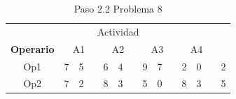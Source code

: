 \documentclass[12pt]{article}  %
\begin{document}
\begin{table}[H]
\centering
\caption{Paso 2.2 Problema 8}
\label{tab:Paso2.2Prob8}
\begin{tabular}{ccclcclcclcclc}
\multicolumn{14}{c}{Actividad}                                                                                                                                                                                                                                                                                                                                                                                                                                                                                                                                                                                                                                             \\ \cline{2-13}
\multicolumn{1}{c|}{\textbf{Operario}} & \multicolumn{3}{c|}{A1}                                                                                                                         & \multicolumn{3}{c|}{A2}                                                                                                                         & \multicolumn{3}{c|}{A3}                                                                                                                         & \multicolumn{3}{c|}{A4}                                                                                                                         & \multicolumn{1}{l}{}      \\ \cline{2-13}
\multicolumn{1}{c|}{Op1}               & \multicolumn{1}{c|}{\cellcolor[HTML]{67FD9A}7} & \multicolumn{1}{c|}{\cellcolor[HTML]{FFCC67}5} & \multicolumn{1}{l|}{\cellcolor[HTML]{FCFF2F}} & \multicolumn{1}{c|}{\cellcolor[HTML]{67FD9A}6} & \multicolumn{1}{c|}{\cellcolor[HTML]{FFCC67}4} & \multicolumn{1}{l|}{\cellcolor[HTML]{F8FF00}} & \multicolumn{1}{c|}{\cellcolor[HTML]{67FD9A}9} & \multicolumn{1}{c|}{\cellcolor[HTML]{FFCC67}7} & \multicolumn{1}{l|}{\cellcolor[HTML]{F8FF00}} & \multicolumn{1}{c|}{\cellcolor[HTML]{67FD9A}2} & \multicolumn{1}{c|}{\cellcolor[HTML]{FFC702}0} & \multicolumn{1}{l|}{\cellcolor[HTML]{F8FF00}} & \cellcolor[HTML]{FFCCC9}2 \\ \cline{2-13}
\multicolumn{1}{c|}{Op2}               & \multicolumn{1}{c|}{\cellcolor[HTML]{67FD9A}7} & \multicolumn{1}{c|}{\cellcolor[HTML]{FFCC67}2} & \multicolumn{1}{l|}{\cellcolor[HTML]{FCFF2F}} & \multicolumn{1}{c|}{\cellcolor[HTML]{67FD9A}8} & \multicolumn{1}{c|}{\cellcolor[HTML]{FFCC67}3} & \multicolumn{1}{l|}{\cellcolor[HTML]{F8FF00}} & \multicolumn{1}{c|}{\cellcolor[HTML]{67FD9A}5} & \multicolumn{1}{c|}{\cellcolor[HTML]{FFCC67}0} & \multicolumn{1}{l|}{\cellcolor[HTML]{F8FF00}} & \multicolumn{1}{c|}{\cellcolor[HTML]{67FD9A}8} & \multicolumn{1}{c|}{\cellcolor[HTML]{FFC702}3} & \multicolumn{1}{l|}{\cellcolor[HTML]{F8FF00}} & \cellcolor[HTML]{FFCCC9}5 \\ \cline{2-13}

\end{tabular}
\end{table}
\end{document}
